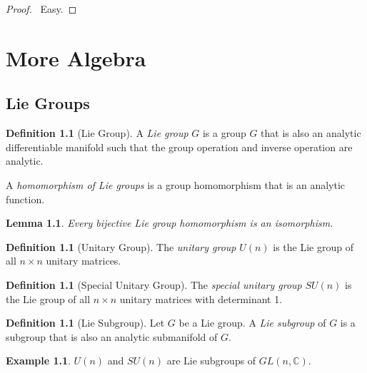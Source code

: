\documentclass{book}
\let\qed\relax
\newtheorem{lm}[prop]{Lemma}
\theoremstyle{definition}
\newtheorem{df}[prop]{Definition}
\newtheorem{ex}[prop]{Example}
\begin{document}
\begin{proof}
\pf\ Easy. \qed
\end{proof}

\part{More Algebra}

\chapter{Lie Groups}

\begin{df}[Lie Group]
A \emph{Lie group} $G$ is a group $G$ that is also an analytic differentiable manifold such that the group operation and inverse operation are analytic.

A \emph{homomorphism of Lie groups} is a group homomorphism that is an analytic function.
\end{df}

\begin{lm}
Every bijective Lie group homomorphism is an isomorphism.
\end{lm}


\begin{df}[Unitary Group]
The \emph{unitary group} $U(n)$ is the Lie group of all $n \times n$ unitary matrices.
\end{df}

\begin{df}[Special Unitary Group]
The \emph{special unitary group} $SU(n)$ is the Lie group of all $n \times n$ unitary matrices with determinant 1.
\end{df}

\begin{df}[Lie Subgroup]
Let $G$ be a Lie group. A \emph{Lie subgroup} of $G$ is a subgroup that is also an analytic submanifold of $G$.
\end{df}

\begin{ex}
$U(n)$ and $SU(n)$ are Lie subgroups of $GL(n, \mathbb{C})$.
\end{ex}
\end{document}
